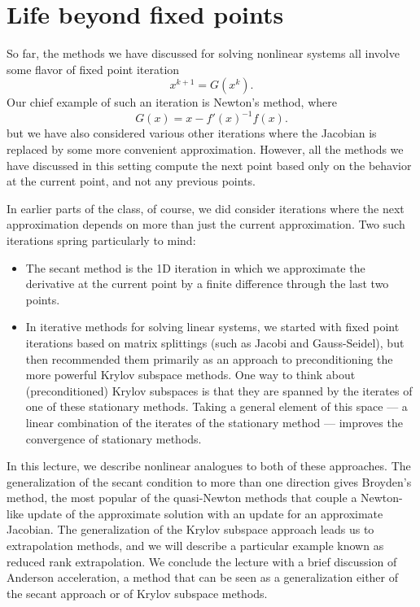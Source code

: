 \documentclass[12pt, leqno]{article} %
\providecommand{\tightlist}{%
  \setlength{\itemsep}{0pt}\setlength{\parskip}{0pt}}
\begin{document}

\section{Life beyond fixed points}

So far, the methods we have discussed for solving nonlinear systems all
involve some flavor of fixed point iteration \[x^{k+1} = G(x^k).\] Our
chief example of such an iteration is Newton's method, where
\[G(x) = x - f'(x)^{-1} f(x).\] but we have also considered various
other iterations where the Jacobian is replaced by some more convenient
approximation. However, all the methods we have discussed in this
setting compute the next point based only on the behavior at the current
point, and not any previous points.

In earlier parts of the class, of course, we did consider iterations
where the next approximation depends on more than just the current
approximation. Two such iterations spring particularly to mind:

\begin{itemize}
\tightlist
\item
  The secant method is the 1D iteration in which we approximate the
  derivative at the current point by a finite difference through the
  last two points.
\item
  In iterative methods for solving linear systems, we started with fixed
  point iterations based on matrix splittings (such as Jacobi and
  Gauss-Seidel), but then recommended them primarily as an approach to
  preconditioning the more powerful Krylov subspace methods. One way to
  think about (preconditioned) Krylov subspaces is that they are spanned
  by the iterates of one of these stationary methods. Taking a general
  element of this space --- a linear combination of the iterates of the
  stationary method --- improves the convergence of stationary methods.
\end{itemize}

In this lecture, we describe nonlinear analogues to both of these
approaches. The generalization of the secant condition to more than one
direction gives Broyden's method, the most popular of the quasi-Newton
methods that couple a Newton-like update of the approximate solution
with an update for an approximate Jacobian. The generalization of the
Krylov subspace approach leads us to extrapolation methods, and we will
describe a particular example known as reduced rank extrapolation. We
conclude the lecture with a brief discussion of Anderson acceleration, a
method that can be seen as a generalization either of the secant
approach or of Krylov subspace methods.
\end{document}

